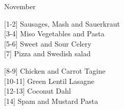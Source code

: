 		\begin{menu}{November}
    
    \begin{recipelist}
    
        {\scriptsize[1-2]} Sausages, Mash and Sauerkraut\\
        {\scriptsize[3-4]} Miso Vegetables and Pasta\\
        {\scriptsize[5-6]} Sweet and Sour Celery\\
        {\scriptsize[7]} Pizza and Swedish salad\\%
    \end{recipelist}%
    \begin{recipelist}
    
        {\scriptsize[8-9]} Chicken and Carrot Tagine\\
        {\scriptsize[10-11]} Green Lentil Lasagne\\
        {\scriptsize[12-13]} Coconut Dahl\\
        {\scriptsize[14]} Spam and Mustard Pasta\\%
    \end{recipelist}\par%
  

\end{menu}
